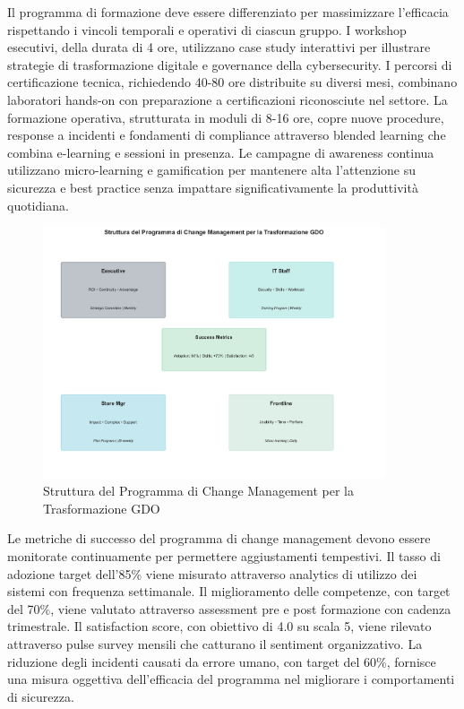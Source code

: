 Il programma di formazione deve essere differenziato per massimizzare l'efficacia rispettando i vincoli temporali e operativi di ciascun gruppo. I workshop esecutivi, della durata di 4 ore, utilizzano case study interattivi per illustrare strategie di trasformazione digitale e governance della cybersecurity. I percorsi di certificazione tecnica, richiedendo 40-80 ore distribuite su diversi mesi, combinano laboratori hands-on con preparazione a certificazioni riconosciute nel settore. La formazione operativa, strutturata in moduli di 8-16 ore, copre nuove procedure, response a incidenti e fondamenti di compliance attraverso blended learning che combina e-learning e sessioni in presenza. Le campagne di awareness continua utilizzano micro-learning e gamification per mantenere alta l'attenzione su sicurezza e best practice senza impattare significativamente la produttività quotidiana.

\begin{figure}[h!]
\centering
\includegraphics[width=0.9\textwidth]{thesis_figures/cap5/fig_5_3_change_mgmt.pdf}
\caption{Struttura del Programma di Change Management per la Trasformazione GDO}
\label{fig:change_management}
\end{figure}

Le metriche di successo del programma di change management devono essere monitorate continuamente per permettere aggiustamenti tempestivi. Il tasso di adozione target dell'85\% viene misurato attraverso analytics di utilizzo dei sistemi con frequenza settimanale. Il miglioramento delle competenze, con target del 70\%, viene valutato attraverso assessment pre e post formazione con cadenza trimestrale. Il satisfaction score, con obiettivo di 4.0 su scala 5, viene rilevato attraverso pulse survey mensili che catturano il sentiment organizzativo. La riduzione degli incidenti causati da errore umano, con target del 60\%, fornisce una misura oggettiva dell'efficacia del programma nel migliorare i comportamenti di sicurezza.

